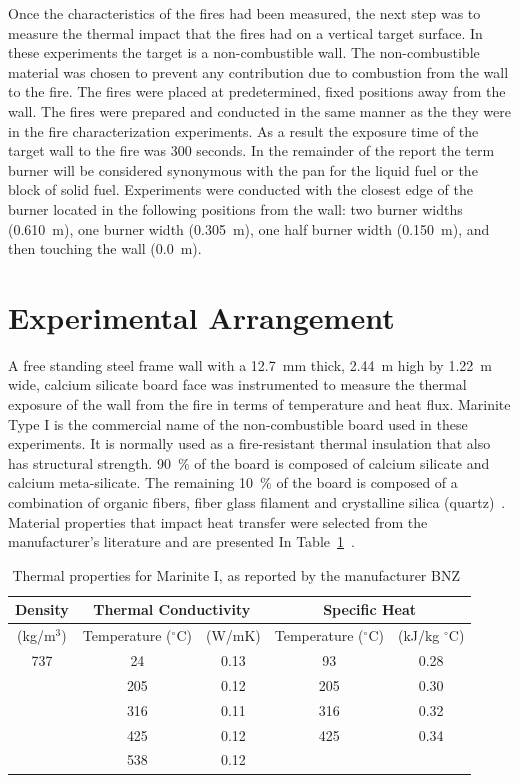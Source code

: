 \documentclass[twoside]{uocthesis}
\begin{document}
{Once the characteristics of the fires had been measured, the next step was to measure the thermal impact that the fires had on a vertical target surface.  In these experiments the target is a non-combustible wall. The non-combustible material was chosen to prevent any contribution due to combustion from the wall to the fire.  The fires were placed at predetermined, fixed positions away from the wall. The fires were prepared and conducted in the same manner as the they were in the fire characterization experiments. As a result the exposure time of the target wall to the fire was 300 seconds. In the remainder of the report the term burner will be considered synonymous with the pan for the liquid fuel or the block of solid fuel. Experiments were conducted with the closest edge of the burner located in the following positions from the wall: two burner widths (0.610~m), one burner width (0.305~m), one half burner width (0.150~m), and then touching the wall (0.0~m).


\section{Experimental Arrangement}

A free standing steel frame wall with a 12.7~mm thick, 2.44~m high by 1.22~m wide, calcium silicate board face was instrumented to measure the thermal exposure of the wall from the fire in terms of temperature and heat flux. Marinite Type I is the commercial name of the non-combustible board used in these experiments.  It is normally used as a fire-resistant thermal insulation that also has structural strength. 90~\% of the board is composed of calcium silicate and calcium meta-silicate.  The remaining 10~\% of the board is composed of a combination of organic fibers, fiber glass filament and crystalline silica (quartz)~\cite{BNZ:MSDS}.  Material properties that impact heat transfer were selected from the manufacturer's literature and are presented In Table~\ref{tab:Marinite_Thermal_Properties}~\cite{Marinite:1997}.

\begin{table}
	\centering
\begin{tabular}{|c|c|c|c|c|}
	\hline Density & \multicolumn{2}{c|}{Thermal Conductivity} & \multicolumn{2}{c|}{Specific Heat}   \\
	\hline (kg/m$^3$) & Temperature ($^\circ$C) & (W/mK)  & Temperature ($^\circ$C)  & (kJ/kg $^\circ$C) \\ \hline
	\hline 737  & 24 & 0.13 & 93 & 0.28 \\
	\hline  & 205 & 0.12  & 205 & 0.30 \\
	\hline  & 316 & 0.11 & 316 & 0.32 \\
	\hline  & 425 & 0.12 & 425 & 0.34 \\
	\hline  & 538 & 0.12 &  &  \\
	\hline
\end{tabular}
\caption[Thermal properties for Marinite I]{Thermal properties for Marinite I, as reported by the manufacturer BNZ~\cite{Marinite:1997}}
\label{tab:Marinite_Thermal_Properties}
\end{table}

}
\end{document}
